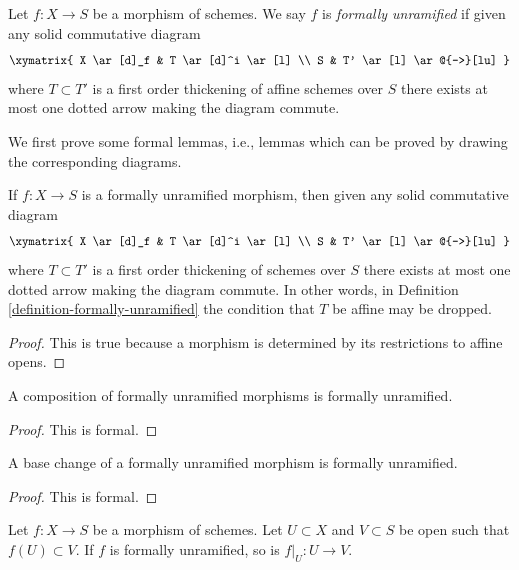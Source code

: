 \begin{definition}
\label{definition-formally-unramified}
Let $f : X \to S$ be a morphism of schemes.
We say $f$ is {\it formally unramified} if given any solid commutative diagram
$$
\xymatrix{
X \ar[d]_f & T \ar[d]^i \ar[l] \\
S & T' \ar[l] \ar@{-->}[lu]
}
$$
where $T \subset T'$ is a first order thickening of affine schemes over $S$
there exists at most one dotted arrow making the diagram commute.
\end{definition}

\noindent
We first prove some formal lemmas, i.e., lemmas which can be proved by
drawing the corresponding diagrams.

\begin{lemma}
\label{lemma-formally-unramified-not-affine}
If $f : X \to S$ is a formally unramified morphism, then given
any solid commutative diagram
$$
\xymatrix{
X \ar[d]_f & T \ar[d]^i \ar[l] \\
S & T' \ar[l] \ar@{-->}[lu]
}
$$
where $T \subset T'$ is a first order thickening of schemes over $S$
there exists at most one dotted arrow making the diagram commute.
In other words, in
Definition \ref{definition-formally-unramified}
the condition that $T$ be affine may be dropped.
\end{lemma}

\begin{proof}
This is true because a morphism is determined by its restrictions
to affine opens.
\end{proof}

\begin{lemma}
\label{lemma-composition-formally-unramified}
A composition of formally unramified morphisms is formally unramified.
\end{lemma}

\begin{proof}
This is formal.
\end{proof}

\begin{lemma}
\label{lemma-base-change-formally-unramified}
A base change of a formally unramified morphism is formally unramified.
\end{lemma}

\begin{proof}
This is formal.
\end{proof}

\begin{lemma}
\label{lemma-formally-unramified-on-opens}
Let $f : X \to S$ be a morphism of schemes.
Let $U \subset X$ and $V \subset S$ be open such that
$f(U) \subset V$. If $f$ is formally unramified, so is $f|_U : U \to V$.
\end{lemma}

